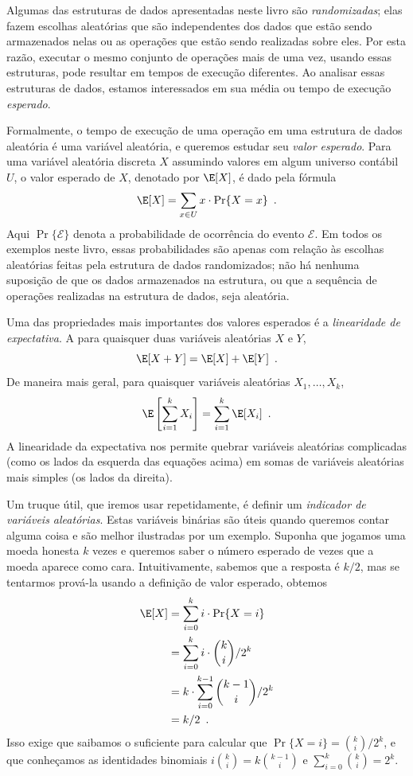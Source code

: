 %
%
%
%
Algumas das estruturas de dados apresentadas neste livro são \emph{randomizadas}; elas fazem 
escolhas aleatórias que são independentes dos dados que estão sendo armazenados nelas ou as 
operações que estão sendo realizadas sobre eles. Por esta razão, executar o mesmo conjunto 
de operações mais de uma vez, usando essas estruturas, pode resultar em tempos de execução 
diferentes. Ao analisar essas estruturas de dados, estamos interessados em sua média ou 
tempo de execução \emph{esperado}.
%
%

Formalmente, o tempo de execução de uma operação em uma estrutura de dados aleatória é uma variável aleatória, e queremos estudar seu \emph{valor esperado}. 
%
Para uma variável aleatória discreta $X$ assumindo valores em algum universo contábil $U$, 
o valor esperado de $X$, denotado por $\E[X]$, é dado pela fórmula
\[
\E[X] = \sum_{x\in U} x\cdot\Pr\{X=x\} \enspace .
\]
Aqui $\Pr\{\mathcal{E}\}$ denota a probabilidade de ocorrência do evento 
$\mathcal{E}$. Em todos os exemplos neste livro, essas probabilidades são apenas com relação às escolhas aleatórias feitas pela estrutura de dados randomizados; não há nenhuma suposição de que os dados armazenados na estrutura, ou que a sequência de operações realizadas na estrutura de dados, seja aleatória.

Uma das propriedades mais importantes dos valores esperados é a \emph{linearidade de 
	expectativa}. 
A 
para quaisquer duas variáveis aleatórias $X$ e $Y$,
\[
\E[X+Y] = \E[X] + \E[Y] \enspace .
\]
De maneira mais geral, para quaisquer variáveis aleatórias $X_1,\ldots,X_k$,
\[
\E\left[\sum_{i=1}^k X_i\right] = \sum_{i=1}^k \E[X_i] \enspace .
\]
A linearidade da expectativa nos permite quebrar variáveis aleatórias complicadas (como os 
lados da esquerda das equações acima) em somas de variáveis aleatórias mais simples (os lados da direita).

Um truque útil, que iremos usar repetidamente, é definir um \emph{indicador de variáveis aleatórias}.
%
Estas variáveis binárias são úteis quando queremos contar alguma coisa e são melhor 
ilustradas por um exemplo. Suponha que jogamos uma moeda honesta $k$ vezes e queremos 
saber o número esperado de vezes que a moeda aparece como cara.
%
Intuitivamente, sabemos que a resposta é $k/2$, mas se tentarmos prová-la usando a definição de valor esperado, obtemos
\begin{align*}
\E[X] & = \sum_{i=0}^k i\cdot\Pr\{X=i\} \\
& = \sum_{i=0}^k i\cdot\binom{k}{i}/2^k \\
& = k\cdot \sum_{i=0}^{k-1}\binom{k-1}{i}/2^k \\
& = k/2 \enspace .
\end{align*}
Isso exige que saibamos o suficiente para calcular que $\Pr\{X=i\}
= \binom{k}{i}/2^k$, e que conheçamos as identidades binomiais
$i\binom{k}{i}=k\binom{k-1}{i}$ e $\sum_{i=0}^{k} \binom{k}{i} = 2^{k}$.

